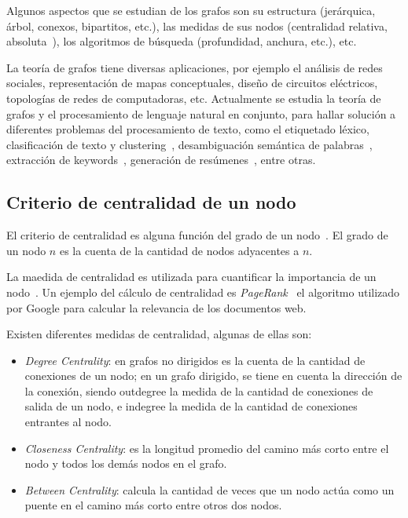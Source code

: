 Algunos aspectos que se estudian de los grafos son su estructura (jerárquica, árbol, conexos, bipartitos, etc.), las medidas de sus nodos (centralidad relativa, absoluta~\cite{freeman1978centrality}), los algoritmos de búsqueda (profundidad, anchura, etc.), etc.

La teoría de grafos tiene diversas aplicaciones, por ejemplo el análisis de redes sociales, representación de mapas conceptuales, diseño de circuitos eléctricos, topologías de redes de computadoras, etc. Actualmente se estudia la teoría de grafos y el procesamiento de lenguaje natural en conjunto, para hallar solución a diferentes problemas del procesamiento de texto, como el etiquetado léxico, clasificación de texto y clustering~\cite{mihalcea2011graph}, desambiguación semántica de palabras~\cite{MihalceaSinhaDisambiguation}\cite{ArabJahromiDisambiguation}, extracción de keywords~\cite{Litvak:2008:GKE:1613172.1613178}\cite{beliga2015overview}, generación de resúmenes~\cite{plaza2011uso}, entre otras.

\subsection{Criterio de centralidad de un nodo}
El criterio de centralidad es alguna función del grado de un nodo~\cite{freeman1978centrality}. El grado de un nodo $n$ es la cuenta de la cantidad de nodos adyacentes a $n$. 

La maedida de centralidad es utilizada para cuantificar la importancia de un nodo~\cite{2018transfer}. Un ejemplo del cálculo de centralidad es \emph{PageRank}~\cite{page1999pagerank} el algoritmo utilizado por Google para calcular la relevancia de los documentos web.

Existen diferentes medidas de centralidad, algunas de ellas son:
\begin{itemize}
    \item \emph{Degree Centrality}: en grafos no dirigidos es la cuenta de la cantidad de conexiones de un nodo; en un grafo dirigido, se tiene en cuenta la dirección de la conexión, siendo outdegree la medida de la cantidad de conexiones de salida de un nodo, e indegree la medida de la cantidad de conexiones entrantes al nodo. 
    \item \emph{Closeness Centrality}: es la longitud promedio del camino más corto entre el nodo y todos los demás nodos en el grafo.
    \item \emph{Between Centrality}: calcula la cantidad de veces que un nodo actúa como un puente en el camino más corto entre otros dos nodos.
\end{itemize}


